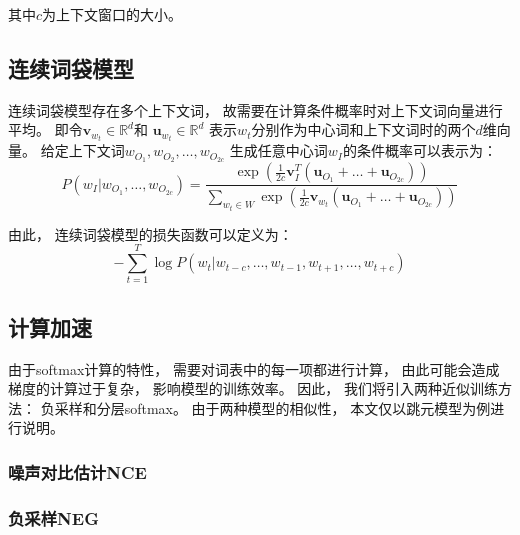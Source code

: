 其中$c$为上下文窗口的大小。

\subsection{连续词袋模型}

连续词袋模型存在多个上下文词，
故需要在计算条件概率时对上下文词向量进行平均。
即令$\mathbf{v}_{w_t}\in\mathbb{R}^d$和
$\mathbf{u}_{w_t}\in\mathbb{R}^d$
表示$w_t$分别作为中心词和上下文词时的两个$d$维向量。
给定上下文词$w_{O_1}, w_{O_2}, \ldots, w_{O_{2c}}$
生成任意中心词$w_I$的条件概率可以表示为：
\begin{equation}
    P\left(w_I|w_{O_1}, \ldots, w_{O_{2c}}\right) = \frac{\exp\left(\frac{1}{2c}\mathbf{v}_I^T\left(\mathbf{u}_{O_1}+\ldots+\mathbf{u}_{O_{2c}}\right)\right)}{\sum_{w_t\in W}\exp\left(\frac{1}{2c}\mathbf{v}_{w_t}\left(\mathbf{u}_{O_1}+\ldots+\mathbf{u}_{O_{2c}}\right)\right)}
\end{equation}

由此，
连续词袋模型的损失函数可以定义为：
\begin{equation}
    -\sum_{t=1}^T\log P\left(w_t|w_{t-c}, \ldots, w_{t-1}, w_{t+1}, \ldots, w_{t+c}\right)
\end{equation}

\subsection{计算加速}

由于softmax计算的特性，
需要对词表中的每一项都进行计算，
由此可能会造成梯度的计算过于复杂，
影响模型的训练效率。
因此，
我们将引入两种近似训练方法：
负采样和分层softmax。
由于两种模型的相似性，
本文仅以跳元模型为例进行说明。

\subsubsection{噪声对比估计NCE}

\subsubsection{负采样NEG}